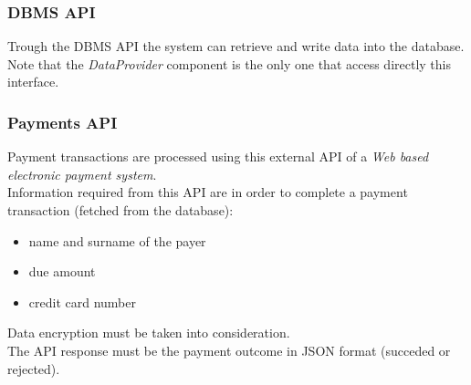 \subsubsection{DBMS API}
Trough the DBMS API the system can retrieve and write data into the database. Note that the \mbox{\emph{DataProvider}} component is the only one that access directly this interface.

\subsubsection{Payments API}
Payment transactions are processed using this external API of a \emph{Web based electronic payment system}.\\
Information required from this API are in order to complete a payment transaction (fetched from the database):
\begin{itemize}
	\item name and surname of the payer
	\item due amount
	\item credit card number
\end{itemize}
Data encryption must be taken into consideration.\\
The API response must be the payment outcome in JSON format (succeded or rejected).
